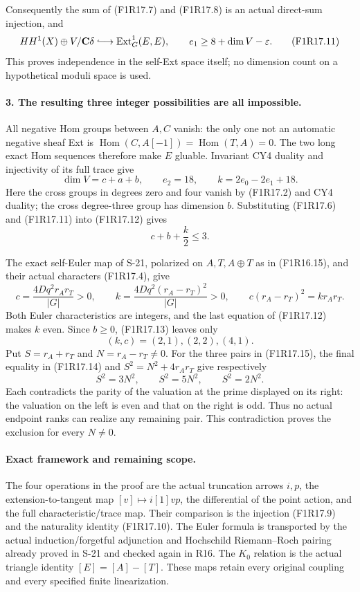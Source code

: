 Consequently the sum of (F1R17.7) and (F1R17.8) is an
actual direct-sum injection, and
\[
         HH^1(X)\oplus V/\mathbf C\delta
                    \lhook\joinrel\longrightarrow
                    \operatorname{Ext}^1_G(E,E),
       \qquad e_1\ge8+\dim V-\varepsilon.
 \tag{F1R17.11}
\]
This proves independence in the self-Ext space itself;
no dimension count on a hypothetical moduli space is used.

\paragraph{3. The resulting three integer possibilities are all impossible.}
All negative Hom groups between $A,C$ vanish: the only
one not an automatic negative sheaf Ext is
$\operatorname{Hom}(C,A[-1])=\operatorname{Hom}(T,A)=0$.
The two long exact Hom sequences therefore make $E$
gluable. Invariant CY4 duality and injectivity of its
full trace give
\[
 \dim V=c+a+b,\qquad e_2=18,\qquad
 k=2e_0-2e_1+18.
 \tag{F1R17.12}
\]
Here the cross groups in degrees zero and four vanish
by (F1R17.2) and CY4 duality; the cross degree-three
group has dimension $b$. Substituting (F1R17.6) and
(F1R17.11) into (F1R17.12) gives
\[
                              c+b+\frac{k}{2}\le3.
 \tag{F1R17.13}
\]

The exact self-Euler map of S-21, polarized on
$A,T,A\oplus T$ as in (F1R16.15), and their actual
characters (F1R17.4), give
\[
 c=\frac{4Dq^2r_A r_T}{|G|}>0,
       \qquad
 k=\frac{4Dq^2(r_A-r_T)^2}{|G|}>0,
       \qquad
 c(r_A-r_T)^2=k r_A r_T.
 \tag{F1R17.14}
\]
Both Euler characteristics are integers, and the last
equation of (F1R17.12) makes $k$ even. Since $b\ge0$,
(F1R17.13) leaves only
\[
                           (k,c)=(2,1),(2,2),(4,1).
 \tag{F1R17.15}
\]
Put $S=r_A+r_T$ and $N=r_A-r_T\ne0$. For the three
pairs in (F1R17.15), the final equality in
(F1R17.14) and $S^2=N^2+4r_A r_T$ give respectively
\[
                         S^2=3N^2,\qquad
                         S^2=5N^2,\qquad
                         S^2=2N^2.
 \tag{F1R17.16}
\]
Each contradicts the parity of the valuation at the
prime displayed on its right: the valuation on the left
is even and that on the right is odd. Thus no actual
endpoint ranks can realize any remaining pair. This
contradiction proves the exclusion for every $N\ne0$.

\paragraph{Exact framework and remaining scope.}
The four operations in the proof are the actual
truncation arrows $i,p$, the extension-to-tangent map
$[v]\mapsto i[1]vp$, the differential of the point action,
and the full characteristic/trace map. Their comparison
is the injection (F1R17.9) and the naturality identity
(F1R17.10). The Euler formula is transported by the
actual induction/forgetful adjunction and Hochschild
Riemann--Roch pairing already proved in S-21 and checked
again in R16. The $K_0$ relation is the actual triangle
identity $[E]=[A]-[T]$. These maps retain every original
coupling and every specified finite linearization.

